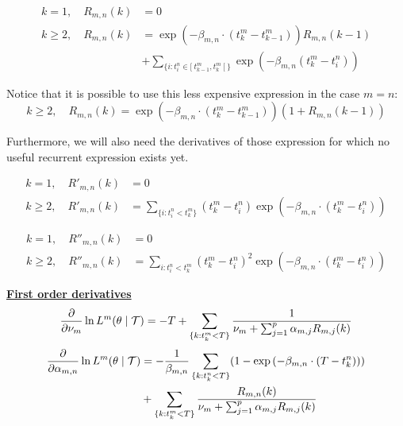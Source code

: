 \begin{align*}
k = 1, \quad R_{m,n} (k) &= 0 \\
k \geq 2, \quad R_{m,n} (k) &= \exp ( - \beta_{m,n} \cdot ( t_k^m - t^m_{k-1} ) ) R_{m,n} (k-1) \\ 
& + \sum_{ \{i: t_i^n \in [ \ t_{k-1}^m, t_k^m \ [ \  \} } \exp ( - \beta_{m,n} ( t^m_k - t_i^n ) )
\end{align*}


\begin{remarque}
Notice that it is possible to use this less expensive expression in the case $m=n$: 
$$k \geq 2, \quad R_{m,n} (k) = \exp ( - \beta_{m,n} \cdot ( t_k^m - t^m_{k-1} ) ) (1 + R_{m,n} (k-1))$$

\end{remarque}

Furthermore, we will also need the derivatives of those expression for which no useful recurrent expression exists yet. 


\begin{align*}
k = 1, \quad R'_{m,n} (k) &= 0 \\
k \geq 2, \quad R'_{m,n} (k) &= \sum_{ \{i : t_i^n < t_k^m \} } (t_k^m - t_i^n)  \exp \left ( - \beta_{m,n} \cdot ( t_k^m - t_i^n ) \right )
\end{align*}


\begin{align*}
k = 1, \quad R''_{m,n} (k) &= 0 \\
k \geq 2, \quad R''_{m,n} (k) &= \sum_{i : t_i^n < t_k^m } (t_k^m - t_i^n)^2  \exp ( - \beta_{m,n} \cdot ( t_k^m - t_i^n ) )
\end{align*}















\vspace{0.6 cm}
\underline{\textbf{First order derivatives}}
\begin{equation}
\frac{\partial } {\partial \nu_m} \ln L^m ( \theta \mid \mathcal{T} ) = - T + \sum_{ \{k : t_k^m < T \} } \frac 1 {\nu_m + \sum_{j=1}^p \alpha_{m,j} R_{m,j} (k)}
\end{equation}
\begin{align}
\frac{\partial  } {\partial \alpha_{m,n}} \ln L^m ( \theta \mid \mathcal{T} ) &= - \frac 1 {\beta_{m,n}} \sum_{ \{k : t_k^n < T \} } ( 1 - \exp \left ( - \beta_{m,n} \cdot ( T - t_k^n ) \right ) ) \notag \\ &+ \sum_{ \{k : t_k^m < T \} } \frac{R_{m,n}(k)}{\nu_m + \sum_{j=1}^p \alpha_{m,j} R_{m,j} (k)}
\end{align}

